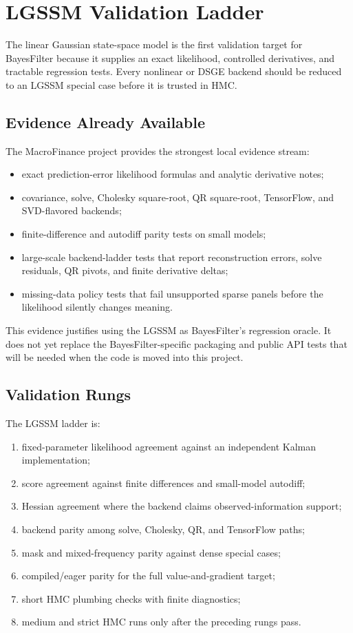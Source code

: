 \chapter{LGSSM Validation Ladder}
\label{ch:bf-lgssm-validation}

The linear Gaussian state-space model is the first validation target for
BayesFilter because it supplies an exact likelihood, controlled derivatives,
and tractable regression tests.  Every nonlinear or DSGE backend should be
reduced to an LGSSM special case before it is trusted in HMC.

\section{Evidence Already Available}
\label{sec:bf-lgssm-evidence}

The MacroFinance project provides the strongest local evidence stream:
\begin{itemize}
  \item exact prediction-error likelihood formulas and analytic derivative
    notes;
  \item covariance, solve, Cholesky square-root, QR square-root, TensorFlow, and
    SVD-flavored backends;
  \item finite-difference and autodiff parity tests on small models;
  \item large-scale backend-ladder tests that report reconstruction errors,
    solve residuals, QR pivots, and finite derivative deltas;
  \item missing-data policy tests that fail unsupported sparse panels before
    the likelihood silently changes meaning.
\end{itemize}
This evidence justifies using the LGSSM as BayesFilter's regression oracle.  It
does not yet replace the BayesFilter-specific packaging and public API tests
that will be needed when the code is moved into this project.

\section{Validation Rungs}
\label{sec:bf-lgssm-rungs}

The LGSSM ladder is:
\begin{enumerate}[label=(\roman*)]
  \item fixed-parameter likelihood agreement against an independent Kalman
    implementation;
  \item score agreement against finite differences and small-model autodiff;
  \item Hessian agreement where the backend claims observed-information
    support;
  \item backend parity among solve, Cholesky, QR, and TensorFlow paths;
  \item mask and mixed-frequency parity against dense special cases;
  \item compiled/eager parity for the full value-and-gradient target;
  \item short HMC plumbing checks with finite diagnostics;
  \item medium and strict HMC runs only after the preceding rungs pass.
\end{enumerate}

